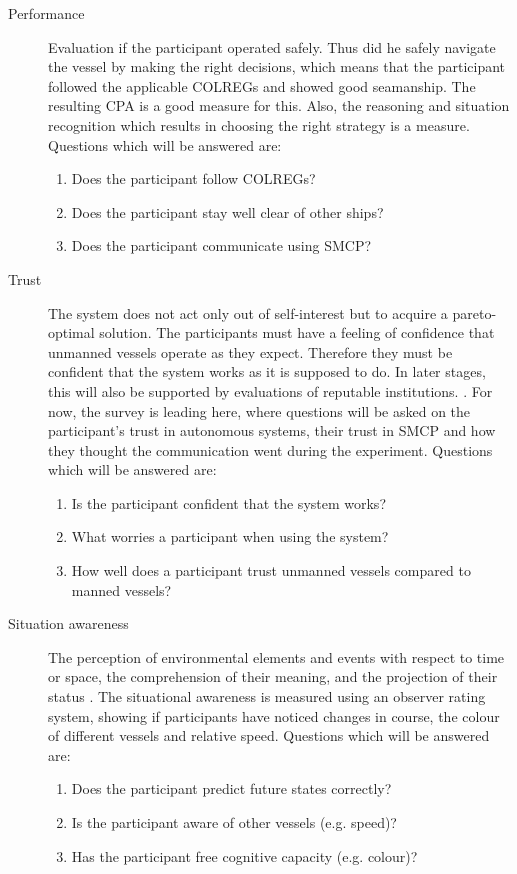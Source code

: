 \begin{description}
	\item [Performance] \performance Evaluation if the participant operated safely. Thus did he safely navigate the vessel by making the right decisions, which means that the participant followed the applicable \ac{COLREGs} and showed good seamanship. The resulting \acf{CPA} is a good measure for this. Also, the reasoning and situation recognition which results in choosing the right strategy is a measure. Questions which will be answered are:
	\begin{enumerate}
		\item Does the participant follow \ac{COLREGs}?
		\item Does the participant stay well clear of other ships?
		\item Does the participant communicate using \ac{SMCP}?
	\end{enumerate}
	
	\item [Trust] \trust The system does not act only out of self-interest but to acquire a pareto-optimal solution. The participants must have a feeling of confidence that unmanned vessels operate as they expect. Therefore they must be confident that the system works as it is supposed to do. In later stages, this will also be supported by evaluations of reputable institutions. \cite{Ozawa2013}.
	For now, the survey is leading here, where questions will be asked on the participant's trust in autonomous systems, their trust in SMCP and how they thought the communication went during the experiment. Questions which will be answered are:
	\begin{enumerate}
		\item Is the participant confident that the system works?
		\item What worries a participant when using the system?
		\item How well does a participant trust unmanned vessels compared to manned vessels?
	\end{enumerate}
	
	\item [Situation awareness] \SA The perception of environmental elements and events with respect to time or space, the comprehension of their meaning, and the projection of their status \cite{Naderpour2016}. The situational awareness is measured using an observer rating system, showing if participants have noticed changes in course, the colour of different vessels and relative speed. Questions which will be answered are:
	\begin{enumerate}
		\item Does the participant predict future states correctly?
		\item Is the participant aware of other vessels (e.g. speed)?
		\item Has the participant free cognitive capacity (e.g. colour)?
	\end{enumerate}
	

\end{description}
